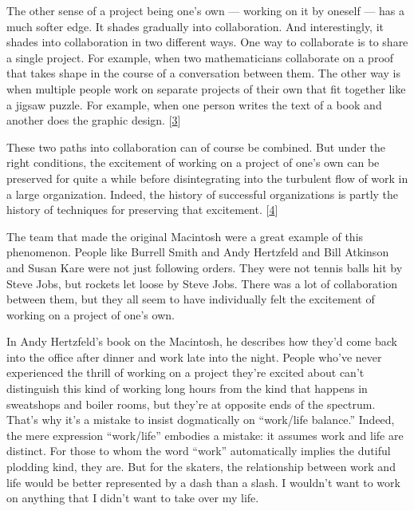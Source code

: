The other sense of a project being one's own --- working on it by
oneself --- has a much softer edge. It shades gradually into
collaboration. And interestingly, it shades into collaboration in two
different ways. One way to collaborate is to share a single project. For
example, when two mathematicians collaborate on a proof that takes shape
in the course of a conversation between them. The other way is when
multiple people work on separate projects of their own that fit together
like a jigsaw puzzle. For example, when one person writes the text of a
book and another does the graphic design. {[}\hyperref[f3n]{3}{]}

These two paths into collaboration can of course be combined. But under
the right conditions, the excitement of working on a project of one's
own can be preserved for quite a while before disintegrating into the
turbulent flow of work in a large organization. Indeed, the history of
successful organizations is partly the history of techniques for
preserving that excitement. {[}\hyperref[f4n]{4}{]}

The team that made the original Macintosh were a great example of this
phenomenon. People like Burrell Smith and Andy Hertzfeld and Bill
Atkinson and Susan Kare were not just following orders. They were not
tennis balls hit by Steve Jobs, but rockets let loose by Steve Jobs.
There was a lot of collaboration between them, but they all seem to have
individually felt the excitement of working on a project of one's own.

In Andy Hertzfeld's book on the Macintosh, he describes how they'd come
back into the office after dinner and work late into the night. People
who've never experienced the thrill of working on a project they're
excited about can't distinguish this kind of working long hours from the
kind that happens in sweatshops and boiler rooms, but they're at
opposite ends of the spectrum. That's why it's a mistake to insist
dogmatically on ``work/life balance.'' Indeed, the mere expression
``work/life'' embodies a mistake: it assumes work and life are distinct.
For those to whom the word ``work'' automatically implies the dutiful
plodding kind, they are. But for the skaters, the relationship between
work and life would be better represented by a dash than a slash. I
wouldn't want to work on anything that I didn't want to take over my
life.

